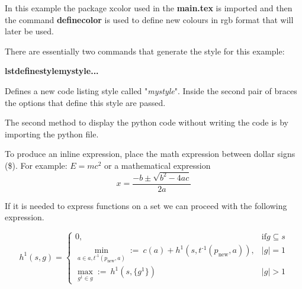 In this example the package xcolor used in the \textbf{main.tex} is imported
and then the command \textbf{definecolor{}{}{}} is used to define new colours
in rgb format that will later be used. 

There are essentially two commands that generate the style for this example:

\textbf{lstdefinestyle{mystyle}{...}}

Defines a new code listing style called "\textit{mystyle}".
Inside the second pair of braces the options that define this style are passed.

The second method to display the python code without writing the code is by
importing the python file. 



To produce an inline expression, place the math expression between dollar signs
(\$).
For example: $E=mc^2$ or a mathematical expression
\[x=\frac{-b\pm\sqrt{b^2-4ac}}{2a}\]

If it is needed to express functions on a set we can proceed with the following
expression.

\begin{equation*} 
  h^1(s,g) = \begin{cases} 

    0, &  \text{if} g \subseteq s \\ 
    \min_{a \in a,t^\text{-1}(p_\text{new},a)} :=~ c(a) + h^1(s,t^\text{-1}(p_\text{new},a)), & |g| = 1 \\
    \max_{g^1 \in g} :=~ h^1 (s,\{g^1\}) & |g| > 1

  \end{cases} 
\end{equation*}
